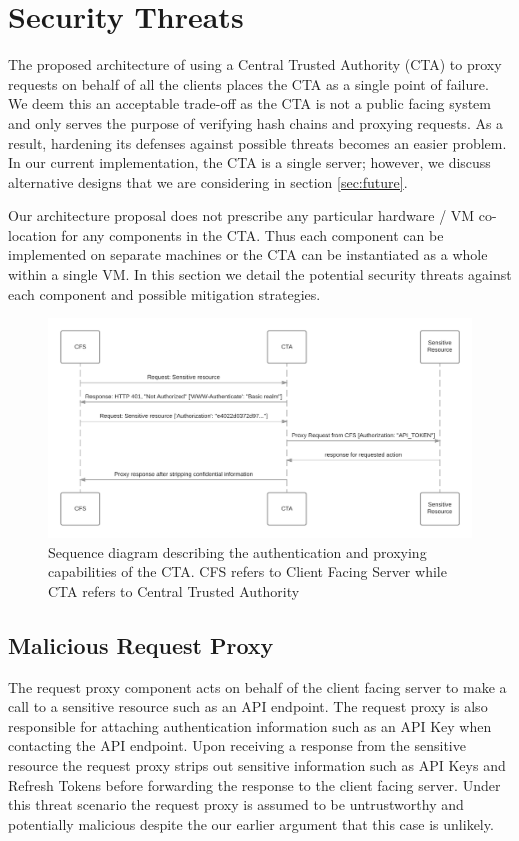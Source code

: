 \documentclass[a4paper,twoside]{article}
\begin{document}
\section{Security Threats}

The proposed architecture of using a Central Trusted Authority (CTA) to proxy requests on behalf of all the clients places the CTA as a single point of failure. We deem this an acceptable trade-off as the CTA is not a public facing system and only serves the purpose of verifying hash chains and proxying requests.  As a result, hardening its defenses against possible threats becomes an easier problem.  In our current implementation, the CTA is a single server; however, we discuss alternative designs that we are considering in section \ref{sec:future}.

Our architecture proposal does not prescribe any particular hardware / VM co-location for any components in the CTA. Thus each component can be implemented on separate machines or the CTA can be instantiated as a whole within a single VM. In this section we detail the potential security threats against each component and possible mitigation strategies.

\begin{figure}[!ht]
  \centering
  \includegraphics[keepaspectratio=true,scale=0.175]{sequence_diagram}
  \caption{Sequence diagram describing the authentication and proxying capabilities of the CTA. CFS refers to Client Facing Server while CTA refers to Central Trusted Authority}
  \label{fig:ctaarchitecture}
\end{figure}
\subsection{Malicious Request Proxy}

The request proxy component acts on behalf of the client facing server to make a call to a sensitive resource such as an API endpoint. The request proxy is also responsible for attaching authentication information such as an API Key when contacting the API endpoint. Upon receiving a response from the sensitive resource the request proxy strips out sensitive information such as API Keys and Refresh Tokens before forwarding the response to the client facing server.  Under this threat scenario the request proxy is assumed to be untrustworthy and potentially malicious despite the our earlier argument that this case is unlikely.
\end{document}
